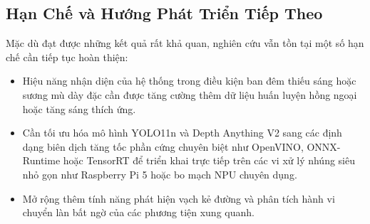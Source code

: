 \documentclass[12pt,a4paper]{article}
\begin{document}
\subsection{Hạn Chế và Hướng Phát Triển Tiếp Theo}
Mặc dù đạt được những kết quả rất khả quan, nghiên cứu vẫn tồn tại một số hạn chế cần tiếp tục hoàn thiện:
\begin{itemize}
    \item Hiệu năng nhận diện của hệ thống trong điều kiện ban đêm thiếu sáng hoặc sương mù dày đặc cần được tăng cường thêm dữ liệu huấn luyện hồng ngoại hoặc tăng sáng thích ứng.
    \item Cần tối ưu hóa mô hình YOLO11n và Depth Anything V2 sang các định dạng biên dịch tăng tốc phần cứng chuyên biệt như OpenVINO, ONNX-Runtime hoặc TensorRT để triển khai trực tiếp trên các vi xử lý nhúng siêu nhỏ gọn như Raspberry Pi 5 hoặc bo mạch NPU chuyên dụng.
    \item Mở rộng thêm tính năng phát hiện vạch kẻ đường và phân tích hành vi chuyển làn bất ngờ của các phương tiện xung quanh.
\end{itemize}
\end{document}
